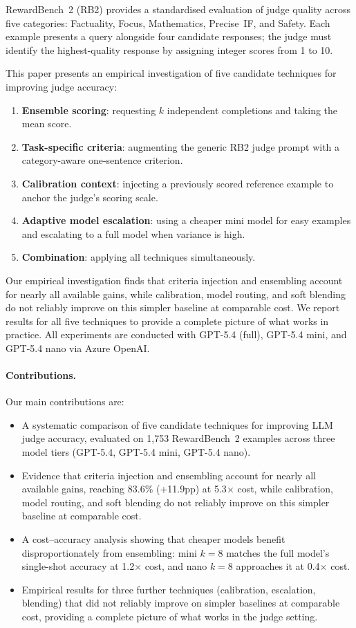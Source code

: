 \documentclass{article}
\begin{document}
RewardBench~2 (RB2) \citep{malik2025rewardbench2} provides a standardised evaluation of judge quality across five categories: Factuality, Focus, Mathematics, Precise~IF, and Safety. Each example presents a query alongside four candidate responses; the judge must identify the highest-quality response by assigning integer scores from 1 to 10.

This paper presents an empirical investigation of five candidate techniques for improving judge accuracy:

\begin{enumerate}
  \item \textbf{Ensemble scoring}: requesting $k$ independent completions and taking the mean score.
  \item \textbf{Task-specific criteria}: augmenting the generic RB2 judge prompt with a category-aware one-sentence criterion.
  \item \textbf{Calibration context}: injecting a previously scored reference example to anchor the judge's scoring scale.
  \item \textbf{Adaptive model escalation}: using a cheaper mini model for easy examples and escalating to a full model when variance is high.
  \item \textbf{Combination}: applying all techniques simultaneously.
\end{enumerate}

Our empirical investigation finds that criteria injection and ensembling account for nearly all available gains, while calibration, model routing, and soft blending do not reliably improve on this simpler baseline at comparable cost. We report results for all five techniques to provide a complete picture of what works in practice. All experiments are conducted with GPT-5.4 (full), GPT-5.4 mini, and GPT-5.4 nano via Azure OpenAI.

\paragraph{Contributions.} Our main contributions are:
\begin{itemize}
  \item A systematic comparison of five candidate techniques for improving LLM judge accuracy, evaluated on 1,753 RewardBench~2 examples across three model tiers (GPT-5.4, GPT-5.4 mini, GPT-5.4 nano).
  \item Evidence that criteria injection and ensembling account for nearly all available gains, reaching 83.6\% (+11.9pp) at 5.3$\times$ cost, while calibration, model routing, and soft blending do not reliably improve on this simpler baseline at comparable cost.
  \item A cost--accuracy analysis showing that cheaper models benefit disproportionately from ensembling: mini $k{=}8$ matches the full model's single-shot accuracy at 1.2$\times$ cost, and nano $k{=}8$ approaches it at 0.4$\times$ cost.
  \item Empirical results for three further techniques (calibration, escalation, blending) that did not reliably improve on simpler baselines at comparable cost, providing a complete picture of what works in the judge setting.
\end{itemize}
\end{document}
